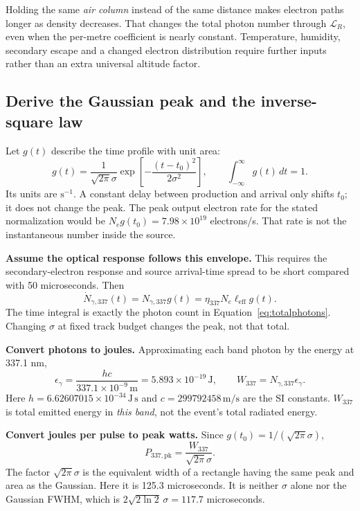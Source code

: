 \documentclass[11pt,a4paper]{article}
\begin{document}
Holding the same \emph{air column} instead of the same distance makes electron paths longer as density decreases. That changes the total photon number through $\mathcal L_R$, even when the per-metre coefficient is nearly constant. Temperature, humidity, secondary escape and a changed electron distribution require further inputs rather than an extra universal altitude factor.

\clearpage
\subsection{Derive the Gaussian peak and the inverse-square law}
\label{sec:gaussianflux}
Let $g(t)$ describe the time profile with unit area:
\begin{equation}
 g(t)=\frac{1}{\sqrt{2\pi}\sigma}
 \exp\!\left[-\frac{(t-t_0)^2}{2\sigma^2}\right],
 \qquad \int_{-\infty}^{\infty}g(t)\,dt=1.
 \label{eq:gaussian}
\end{equation}
Its units are $\mathrm{s^{-1}}$. A constant delay between production and arrival only shifts $t_0$; it does not change the peak. The peak output electron rate for the stated normalization would be $N_e g(t_0)=7.98\times10^{19}$ electrons/s. That rate is not the instantaneous number inside the source.

\textbf{Assume the optical response follows this envelope.} This requires the secondary-electron response and source arrival-time spread to be short compared with 50 microseconds. Then
\begin{equation}
 \dot N_{\gamma,337}(t)=N_{\gamma,337}g(t)
 =\eta_{337}N_e\ell_{\mathrm{eff}}g(t).
 \label{eq:photoncurve}
\end{equation}
The time integral is exactly the photon count in Equation~\eqref{eq:totalphotons}. Changing $\sigma$ at fixed track budget changes the peak, not that total.

\textbf{Convert photons to joules.} Approximating each band photon by the energy at 337.1 nm,
\begin{equation}
 \epsilon_\gamma=\frac{hc}{337.1\times10^{-9}\,\mathrm m}
 =5.893\times10^{-19}\,\mathrm J,
 \qquad W_{337}=N_{\gamma,337}\epsilon_\gamma.
 \label{eq:photonenergy}
\end{equation}
Here $h=6.62607015\times10^{-34}\,\mathrm{J\,s}$ and $c=299792458\,\mathrm{m/s}$ are the SI constants. $W_{337}$ is total emitted energy in \emph{this band}, not the event's total radiated energy.

\textbf{Convert joules per pulse to peak watts.} Since $g(t_0)=1/(\sqrt{2\pi}\sigma)$,
\begin{equation}
 P_{337,\mathrm{pk}}=\frac{W_{337}}{\sqrt{2\pi}\sigma}.
 \label{eq:peakpower}
\end{equation}
The factor $\sqrt{2\pi}\sigma$ is the equivalent width of a rectangle having the same peak and area as the Gaussian. Here it is 125.3 microseconds. It is neither $\sigma$ alone nor the Gaussian FWHM, which is $2\sqrt{2\ln2}\,\sigma=117.7$ microseconds.
\end{document}
